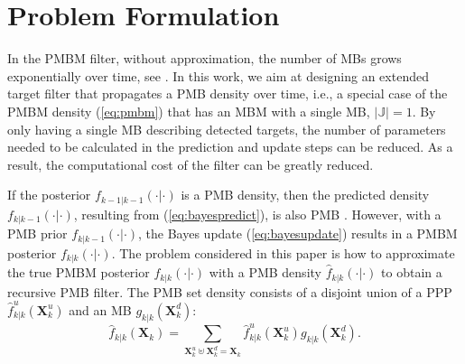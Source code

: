 \documentclass[journal]{IEEEtran}
\begin{document}





\section{Problem Formulation}
In the PMBM filter, without approximation, the number of MBs grows exponentially over time, see \cite{pmbmpoint,pmbmpoint2}. In this work, we aim at designing an extended target filter that propagates a PMB density over time, i.e., a special case of the PMBM density (\ref{eq:pmbm}) that has an MBM with a single MB, $|\mathbb{J}|=1$. By only having a single MB describing detected targets, the number of parameters needed to be calculated in the prediction and update steps can be reduced. As a result, the computational cost of the filter can be greatly reduced.  

If the posterior $f_{k-1|k-1}(\cdot|\cdot)$ is a PMB density, then the predicted density $f_{k|k-1}(\cdot|\cdot)$, resulting from (\ref{eq:bayespredict}), is also PMB \cite{pmbmpoint}. However, with a PMB prior $f_{k|k-1}(\cdot|\cdot)$, the Bayes update (\ref{eq:bayesupdate}) results in a PMBM posterior $f_{k|k}(\cdot|\cdot)$. The problem considered in this paper is how to approximate the true PMBM posterior $f_{k|k}(\cdot|\cdot)$ with a PMB density $\hat{f}_{k|k}(\cdot|\cdot)$ to obtain a recursive PMB filter. The PMB set density consists of a disjoint union of a PPP $\hat{f}_{k|k}^u(\mathbf{X}_k^u)$ and an MB $g_{k|k}(\mathbf{X}_k^d)$:
\begin{equation}
    \hat{f}_{k|k}(\mathbf{X}_k) = \sum_{\mathbf{X}_k^u\uplus\mathbf{X}_k^d=\mathbf{X}_k}\hat{f}_{k|k}^u(\mathbf{X}_k^u)g_{k|k}(\mathbf{X}_k^d).
    \label{eq:pmb}
\end{equation}


\end{document}
